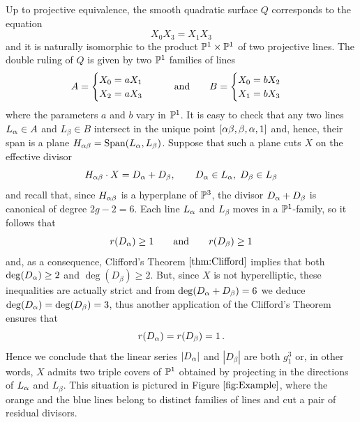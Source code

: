 \begin{example}
 		Up to projective equivalence, the smooth quadratic surface $Q$ corresponds to the equation
 		$$ X_0 X_3 = X_1 X_3 $$
 		and it is naturally isomorphic to the product $\mathbb{P}^1 \times \mathbb{P}^1$ of two projective lines. The double ruling of $Q$ is given by two $\mathbb{P}^1$ families of lines
 		$$ A= \begin{cases} X_0=a X_1 \\ X_2=a X_3 \end{cases} \qquad \text{and} \qquad B= \begin{cases} X_0=b X_2 \\ X_1=b X_3 \end{cases} $$
 		where the parameters $a$ and $b$ vary in $\mathbb{P}^1$. It is easy to check that any two lines $L_\alpha \in A$ and $L_\beta \in B$ intersect in the unique point $[{\alpha\beta}, \beta, \alpha, 1]$ and, hence, their span is a plane $H_{\alpha\beta} = \operatorname{Span}(L_\alpha, L_\beta)$. Suppose that such a plane cuts $X$ on the effective divisor
 		$$ H_{\alpha\beta} \cdot X = D_\alpha + D_\beta, \qquad D_\alpha\in L_\alpha, \; D_\beta\in L_\beta $$
 		and recall that, since $H_{\alpha\beta}$ is a hyperplane of $\mathbb{P}^3$, the divisor $D_\alpha + D_\beta$ is canonical of degree $2g-2=6$.
 		Each line $L_\alpha$ and $L_\beta$ moves in a $\mathbb{P}^1$-family, so it follows that
 		$$ r(D_\alpha) \geq 1 \qquad \text{and} \qquad r(D_\beta) \geq 1 $$
 		and, as a consequence, Clifford's Theorem $\ref{thm:Clifford}$ implies that both $\deg(D_\alpha)\geq 2$ and $\deg(D_\beta)\geq 2$. But, since $X$ is not hyperelliptic, these inequalities are actually strict and from $\deg(D_\alpha+D_\beta)=6$ we deduce
 		$ \deg(D_\alpha) = \deg(D_\beta) = 3 $,
 		thus another application of the Clifford's Theorem ensures that
 		$$ r(D_\alpha) = r(D_\beta) = 1\,. $$
 		Hence we conclude that the linear series $|D_\alpha|$ and $|D_\beta|$ are both $g_1^3$ or, in other words, $X$ admits two triple covers of $\mathbb{P}^1$ obtained by projecting in the directions of $L_\alpha$ and $L_\beta$. This situation is pictured in Figure $\ref{fig:Example}$, where the orange and the blue lines belong to distinct families of lines and cut a pair of residual divisors.
 	
 	\end{example}

